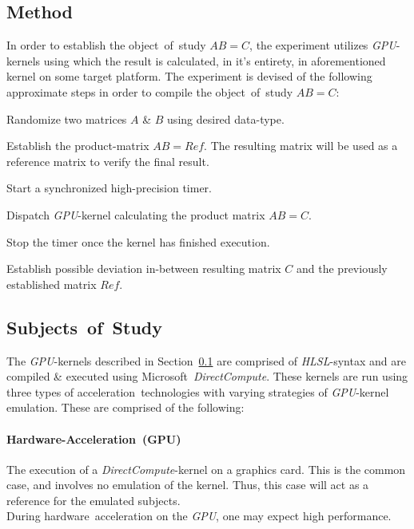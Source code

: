 \documentclass[fleqn,10pt]{SelfArx} %
\begin{document}
\subsection{Method}
\label{sec:contribution:method}
In order to establish the object~of~study $AB=C$, the experiment utilizes \textit{GPU}-kernels using which the result is calculated, in it’s entirety, in aforementioned kernel on some target platform. The experiment is devised of the following approximate steps in order to compile the object~of~study $AB=C$:
\begin{enumerate*}
	\item Randomize two matrices $A$ \& $B$ using desired data-type.
	\item Establish the product-matrix $AB=Ref$. The resulting matrix will be used as a reference matrix to verify the final result.
	\item Start a synchronized high-precision timer.
	\item Dispatch \textit{GPU}-kernel calculating the product matrix $AB=C$.
	\item Stop the timer once the kernel has finished execution.
	\item Establish possible deviation in-between resulting matrix $C$ and the previously established matrix $Ref$.
\end{enumerate*}

\subsection{Subjects~of~Study}
\label{sec:contribution:subjectofstudy}
The \textit{GPU}-kernels described in Section~\ref{sec:contribution:method} are comprised of \textit{HLSL}-syntax and are compiled \& executed using Microsoft~\textit{DirectCompute}. These kernels are run using three types of acceleration~technologies with varying strategies of \textit{GPU}-kernel emulation. These are comprised of the following:
\paragraph{Hardware-Acceleration~(GPU)}
	The execution of a \textit{DirectCompute}-kernel on a graphics card. This is the common case, and involves no emulation of the kernel. Thus, this case will act as a reference for the emulated subjects.\\
	During hardware~acceleration on the \textit{GPU}, one may expect high performance.
\end{document}
